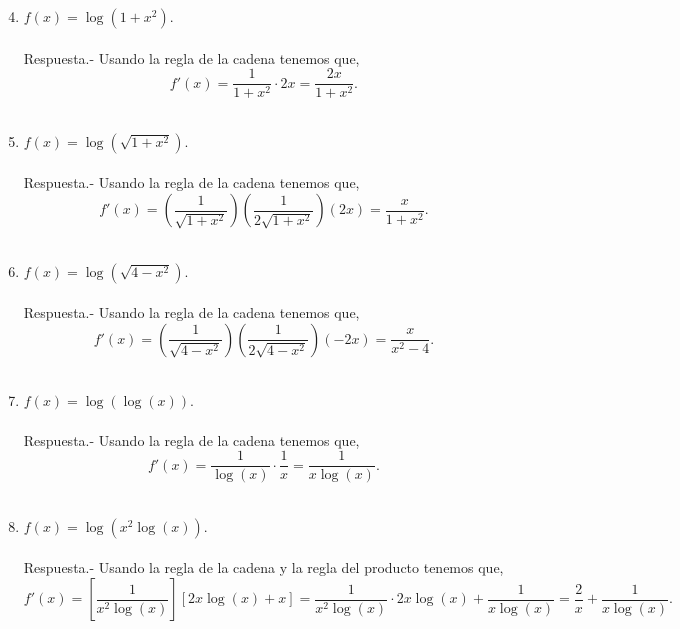 \begin{enumerate}[\bfseries 1.]
\setcounter{enumi}{3}

    \item $f(x)=\log\left(1+x^2\right)$.\\\\
	Respuesta.-\; Usando la regla de la cadena tenemos que,
	$$f'(x)= \dfrac{1}{1+x^2}\cdot 2x =\dfrac{2x}{1+x^2}.$$\\

    \item $f(x)=\log\left(\sqrt{1+x^2}\right)$.\\\\
	Respuesta.-\; Usando la regla de la cadena tenemos que,
	$$f'(x)= \left(\dfrac{1}{\sqrt{1+x^2}}\right)\left( \dfrac{1}{2\sqrt{1+x^2}}\right)(2x) =\dfrac{x}{1+x^2}.$$\\

    \item $f(x)=\log\left(\sqrt{4-x^2}\right)$.\\\\
	Respuesta.-\; Usando la regla de la cadena tenemos que,
	$$f'(x)= \left(\dfrac{1}{\sqrt{4-x^2}}\right)\left( \dfrac{1}{2\sqrt{4-x^2}}\right)(-2x) =\dfrac{x}{x^2-4}.$$\\

    \item $f(x)=\log\left(\log(x)\right)$.\\\\
	Respuesta.-\; Usando la regla de la cadena tenemos que,
	$$f'(x)= \dfrac{1}{\log(x)}\cdot \dfrac{1}{x} =\dfrac{1}{x\log(x)}.$$\\

    \item $f(x)=\log\left(x^2 \log(x)\right)$.\\\\
	Respuesta.-\; Usando la regla de la cadena y la regla del producto tenemos que,
	$$f'(x)= \left[\dfrac{1}{x^2\log(x)}\right]\left[2x\log(x) + x\right] =\dfrac{1}{x^2\log(x)}\cdot 2x\log(x)+\dfrac{1}{x\log(x)} =\dfrac{2}{x}+\dfrac{1}{x\log(x)}.$$\\


\end{enumerate}
